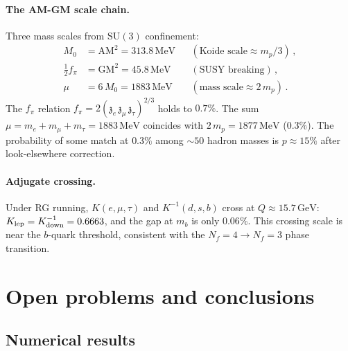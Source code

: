 \documentclass[12pt,a4paper]{article}
\newcommand{\SU}{\mathrm{SU}}
\newcommand{\Nf}{N_{\!f}}
\newcommand{\MeV}{\,\mathrm{MeV}}
\newcommand{\GeV}{\,\mathrm{GeV}}
\newcommand{\zch}{\mathfrak{z}}
\begin{document}
\paragraph{The AM-GM scale chain.}
Three mass scales from $\SU(3)$ confinement:
\begin{align}
  M_0 &= \mathrm{AM}^2 = 313.8\MeV
    && (\text{Koide scale} \approx m_p/3)\,,\\
  \tfrac{1}{2}f_\pi &= \mathrm{GM}^2 = 45.8\MeV
    && (\text{SUSY breaking})\,,\\
  \mu &= 6\,M_0 = 1883\MeV
    && (\text{mass scale} \approx 2\,m_p)\,.
\end{align}
The $f_\pi$ relation $f_\pi = 2(\zch_e\,\zch_\mu\,\zch_\tau)^{2/3}$
holds to $0.7\%$.
The sum $\mu = m_e + m_\mu + m_\tau = 1883\MeV$ coincides with
$2\,m_p = 1877\MeV$ ($0.3\%$).
The probability of some match at $0.3\%$ among $\sim\!50$ hadron
masses is $p \approx 15\%$ after look-elsewhere correction.

\paragraph{Adjugate crossing.}
Under RG running, $K(e,\mu,\tau)$ and $K^{-1}(d,s,b)$ cross at
$Q \approx 15.7\GeV$: $K_{\rm lep} = K^{-1}_{\rm down} = 0.6663$,
and the gap at $m_b$ is only $0.06\%$.
This crossing scale is near the $b$-quark threshold, consistent
with the $\Nf = 4 \to \Nf = 3$ phase transition.


\section{Open problems and conclusions}
\label{sec:open}

\subsection{Numerical results}
\end{document}
